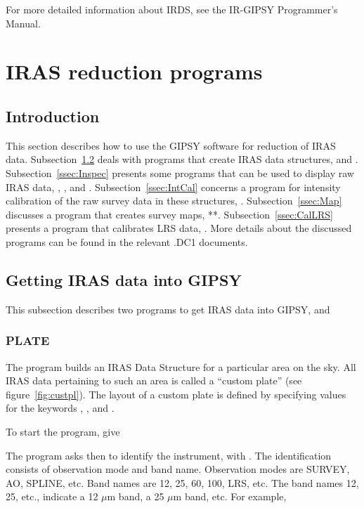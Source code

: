 For more detailed information about IRDS, see the IR-GIPSY Programmer's
Manual. 


\section{IRAS reduction programs}
\label{sec:Prog}

\subsection{Introduction}

This section describes how to use the GIPSY software for reduction of
IRAS data.  Subsection~\ref{ssec:Get} deals with programs that create
IRAS data structures,  and . 
Subsection~\ref{ssec:Inspec} presents some programs that can be used to
display raw IRAS data, , , and
.  Subsection~\ref{ssec:IntCal} concerns a program for
intensity calibration of the raw survey data in these structures,
.  Subsection~\ref{ssec:Map} discusses a program that
creates survey maps, {\sf***}.  Subsection~\ref{ssec:CalLRS} presents a
program that calibrates LRS data, .  More details about
the discussed programs can be found in the relevant .DC1 documents. 

\subsection{Getting IRAS data into GIPSY}
\label{ssec:Get}

This subsection describes two programs to get IRAS data into GIPSY,
 and 


\subsubsection{PLATE}

The program  builds an IRAS Data Structure for a
particular area on the sky.  All IRAS data pertaining to such an area is
called a ``custom plate'' (see figure~\ref{fig:custpl}).  The layout of
a custom plate is defined by specifying values for the keywords
, , and . 

To start the program, give 


The program asks then to identify the instrument, with
.  The identification consists of observation mode
and band name.  Observation modes are SURVEY, AO, SPLINE, etc.  Band
names are 12, 25, 60, 100, LRS, etc.  The band names 12, 25, etc.,
indicate a 12 $\mu$m band, a 25 $\mu$m band, etc.  For example,

